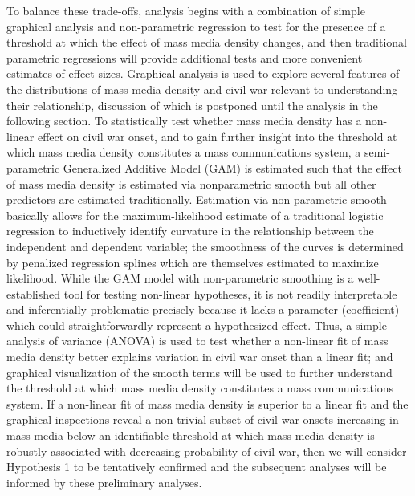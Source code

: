 \documentclass[11pt,article,oneside]{memoir}
\begin{document}
To balance these trade-offs, analysis begins with a combination of
simple graphical analysis and non-parametric regression to test for the
presence of a threshold at which the effect of mass media density
changes, and then traditional parametric regressions will provide
additional tests and more convenient estimates of effect sizes.
Graphical analysis is used to explore several features of the
distributions of mass media density and civil war relevant to
understanding their relationship, discussion of which is postponed until
the analysis in the following section. To statistically test whether
mass media density has a non-linear effect on civil war onset, and to
gain further insight into the threshold at which mass media density
constitutes a mass communications system, a semi-parametric Generalized
Additive Model (GAM) is estimated such that the effect of mass media
density is estimated via nonparametric smooth but all other predictors
are estimated traditionally. Estimation via non-parametric smooth
basically allows for the maximum-likelihood estimate of a traditional
logistic regression to inductively identify curvature in the
relationship between the independent and dependent variable; the
smoothness of the curves is determined by penalized regression splines
which are themselves estimated to maximize likelihood. While the GAM
model with non-parametric smoothing is a well-established tool for
testing non-linear hypotheses, it is not readily interpretable and
inferentially problematic precisely because it lacks a parameter
(coefficient) which could straightforwardly represent a hypothesized
effect. Thus, a simple analysis of variance (ANOVA) is used to test
whether a non-linear fit of mass media density better explains variation
in civil war onset than a linear fit; and graphical visualization of the
smooth terms will be used to further understand the threshold at which
mass media density constitutes a mass communications system. If a
non-linear fit of mass media density is superior to a linear fit and the
graphical inspections reveal a non-trivial subset of civil war onsets
increasing in mass media below an identifiable threshold at which mass
media density is robustly associated with decreasing probability of
civil war, then we will consider Hypothesis 1 to be tentatively
confirmed and the subsequent analyses will be informed by these
preliminary analyses.
\end{document}
